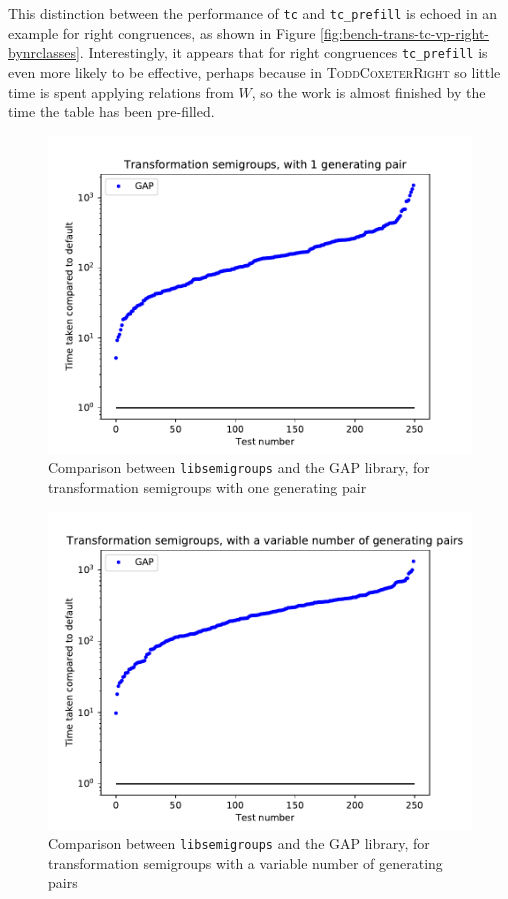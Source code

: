 This distinction between the performance of \texttt{tc} and \texttt{tc\_prefill}
is echoed in an example for right congruences, as shown in Figure
\ref{fig:bench-trans-tc-vp-right-bynrclasses}.  Interestingly, it appears that
for right congruences \texttt{tc\_prefill} is even more likely to be effective,
perhaps because in \textsc{ToddCoxeterRight} so little time is spent applying
relations from $W$, so the work is almost finished by the time the table has
been pre-filled.

\begin{figure}[h]
  \centering
  \includegraphics[width=\textwidth]{pics/ch-pairs/bench-trans-1p-gap}
  \caption{Comparison between \texttt{libsemigroups} and the GAP library, for
    transformation semigroups with one generating pair}
  \label{fig:bench-trans-1p-gap}
\end{figure}

\begin{figure}[h]
  \centering
  \includegraphics[width=\textwidth]{pics/ch-pairs/bench-trans-vp-gap}
  \caption{Comparison between \texttt{libsemigroups} and the GAP library, for
    transformation semigroups with a variable number of generating pairs}
  \label{fig:bench-trans-vp-gap}
\end{figure}

